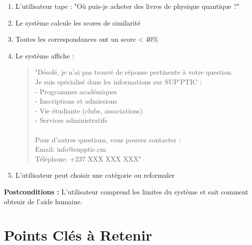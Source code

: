 \documentclass[11pt,a4paper]{article}
\begin{document}
\begin{enumerate}
    \item L'utilisateur tape : "Où puis-je acheter des livres de physique quantique ?"
    \item Le système calcule les scores de similarité
    \item Toutes les correspondances ont un score < 40\%
    \item Le système affiche :
    \begin{quote}
    "Désolé, je n'ai pas trouvé de réponse pertinente à votre question. \\
    Je suis spécialisé dans les informations sur SUP'PTIC : \\
    - Programmes académiques \\
    - Inscriptions et admissions \\
    - Vie étudiante (clubs, associations) \\
    - Services administratifs \\
    \\
    Pour d'autres questions, vous pouvez contacter : \\
    Email: info@supptic.cm \\
    Téléphone: +237 XXX XXX XXX"
    \end{quote}
    \item L'utilisateur peut choisir une catégorie ou reformuler
\end{enumerate}

\textbf{Postconditions :} L'utilisateur comprend les limites du système et sait comment obtenir de l'aide humaine.

\section{Points Clés à Retenir}
\end{document}
